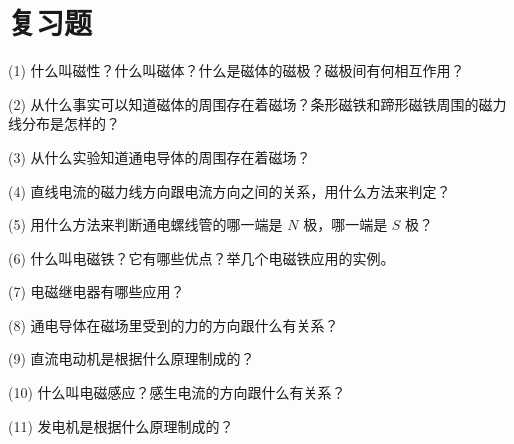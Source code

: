 \section*{复习题}

(1) 什么叫磁性？什么叫磁体？什么是磁体的磁极？磁极间有何相互作用？

(2) 从什么事实可以知道磁体的周围存在着磁场？条形磁铁和蹄形磁铁周围的磁力线分布是怎样的？

(3) 从什么实验知道通电导体的周围存在着磁场？

(4) 直线电流的磁力线方向跟电流方向之间的关系，用什么方法来判定？

(5) 用什么方法来判断通电螺线管的哪一端是 $N$ 极，哪一端是 $S$ 极？

(6) 什么叫电磁铁？它有哪些优点？举几个电磁铁应用的实例。

(7) 电磁继电器有哪些应用？

(8) 通电导体在磁场里受到的力的方向跟什么有关系？

(9) 直流电动机是根据什么原理制成的？

(10) 什么叫电磁感应？感生电流的方向跟什么有关系？

(11) 发电机是根据什么原理制成的？

